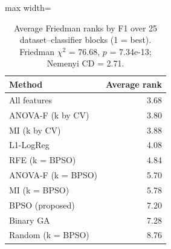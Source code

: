 \begin{table}[!t]
\centering
\caption{Average Friedman ranks by F1 over 25 dataset--classifier blocks (1 = best). Friedman $\chi^2$ = 76.68, $p$ = 7.34e-13; Nemenyi CD = 2.71.}
\label{tab:friedman}
\footnotesize
\setlength{\tabcolsep}{4pt}
\begin{adjustbox}{max width=\linewidth}
\begin{tabular}{lr}
\toprule
\textbf{Method} & \textbf{Average rank} \\
\midrule
All features & 3.68 \\
ANOVA-F (k by CV) & 3.80 \\
MI (k by CV) & 3.88 \\
L1-LogReg & 4.08 \\
RFE (k = BPSO) & 4.84 \\
ANOVA-F (k = BPSO) & 5.70 \\
MI (k = BPSO) & 5.78 \\
BPSO (proposed) & 7.20 \\
Binary GA & 7.28 \\
Random (k = BPSO) & 8.76 \\
\bottomrule
\end{tabular}
\end{adjustbox}
\end{table}
